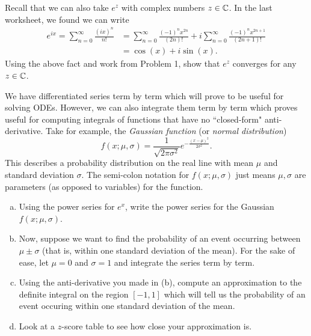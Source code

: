 \begin{problem}
Recall that we can also take $e^z$ with complex numbers $z\in \mathbb{C}$. In the last worksheet, we found we can write
\begin{align*}
e^{ix} = \sum_{n=0}^\infty \frac{(ix)^n}{n!}&= \sum_{n=0}^\infty \frac{(-1)^n x^{2n}}{(2n)!} + i \sum_{n=0}^\infty \frac{(-1)^n x^{2n+1}}{(2n+1)!}\\
&= \cos(x) + i \sin(x).
\end{align*}
Using the above fact and work from Problem 1, show that $e^z$ converges for any $z\in \mathbb{C}$.
\end{problem}

\begin{problem}
We have differentiated series term by term which will prove to be useful for solving ODEs.  However, we can also integrate them term by term which proves useful for computing integrals of functions that have no ``closed-form" anti-derivative.  Take for example, the \emph{Gaussian function} (or \emph{normal distribution})
\[
f(x;\mu,\sigma)=\frac{1}{\sqrt{2\pi \sigma^2}}e^{-\frac{(x-\mu)^2}{2\sigma^2}}.
\]
This describes a probability distribution on the real line with mean $\mu$ and standard deviation $\sigma$. The semi-colon notation for $f(x;\mu,\sigma)$ just means $\mu,\sigma$ are parameters (as opposed to variables) for the function.
\begin{enumerate}[(a)]
    \item Using the power series for $e^x$, write the power series for the Gaussian $f(x;\mu,\sigma)$.
    \item Now, suppose we want to find the probability of an event occurring between $\mu \pm \sigma$ (that is, within one standard deviation of the mean).  For the sake of ease, let $\mu=0$ and $\sigma=1$ and integrate the series term by term.
    \item Using the anti-derivative you made in (b), compute an approximation to the definite integral on the region $[-1,1]$ which will tell us the probability of an event occuring within one standard deviation of the mean.
    \item Look at a $z$-score table to see how close your approximation is.
\end{enumerate}
\end{problem}

